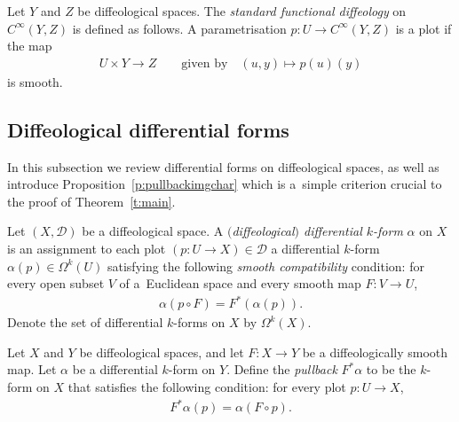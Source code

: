 \documentclass[pdftex]{sigma}
\numberwithin{equation}{section}
\newcommand{\CIN}{{C^\infty}} %
\begin{document}
\begin{Definition}
\label{d:functional}
Let $Y$ and $Z$ be dif\/feological spaces.
The \emph{standard functional diffeology} on $\CIN(Y,Z)$ is def\/ined as follows.
A parametrisation $p \colon U \to \CIN(Y,Z)$ is a plot if the map
 \begin{gather*} U \times Y\to Z \qquad \text{given by} \quad (u,y)\mapsto p(u)(y) \end{gather*}
is smooth.
\end{Definition}

\subsection*{Dif\/feological dif\/ferential forms}

In this subsection we review dif\/ferential forms on dif\/feological spaces, as well as introduce Proposition~\ref{p:pullbackimgchar} which is a~simple criterion crucial to the proof of Theorem~\ref{t:main}.

\begin{Definition}
\label{d:diff forms}
Let $(X,\mathcal{D})$ be a dif\/feological space.
A \emph{$($diffeological$)$ differential $k$-form} $\alpha$ on $X$
is an assignment to each plot $( p \colon U \to X) \in \mathcal{D}$
a dif\/ferential $k$-form $\alpha(p) \in \Omega^k(U)$
satisfying the following \emph{smooth compatibility} condition:
for every open subset $V$ of a~Euclidean space
and every smooth map $F \colon V \to U$,
\begin{gather*} \alpha(p\circ F) = F^* (\alpha(p)) .\end{gather*}
Denote the set of dif\/ferential $k$-forms on $X$ by $\Omega^k(X)$.
\end{Definition}

\begin{Definition}
\label{d:pullback}
Let $X$ and $Y$ be dif\/feological spaces, and let $F \colon X\to Y$
be a dif\/feologically smooth map.
Let $\alpha$ be a dif\/ferential $k$-form on $Y$.
Def\/ine the \emph{pullback} $F^*\alpha$ to be the $k$-form on $X$
that satisf\/ies the following condition:
for every plot $p \colon U \to X$,
\begin{gather*} F^* \alpha(p) = \alpha(F\circ p) .\end{gather*}
\end{Definition}
\end{document}
